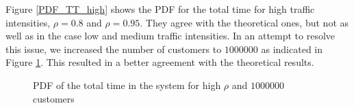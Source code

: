 \documentclass[12pt, a4paper]{article}
\begin{document}
Figure \ref{PDF_TT_high} shows the PDF for the total time for high traffic intensities, 
$\rho=0.8$ and $\rho=0.95$. They agree with the theoretical ones, but not as well as 
in the case low and medium traffic intensities. In an attempt to resolve this issue,
we increased the number of customers to $1000000$ as indicated in Figure \ref{PDF_TT_high_more_cus}.
This resulted in a better agreement with the theoretical results.

\begin{figure}[H]
  \centering
  \hspace{0px}
  \caption{PDF of the total time in the system for high $\rho$ and $1000000$ customers}  
  \label{PDF_TT_high_more_cus}
\end{figure}
\end{document}
